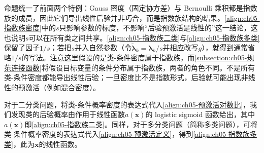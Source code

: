 \documentclass[../../main.tex]{subfiles}
\begin{document}
\begin{remark}
命题统一了前面两个特例：Gauss 密度（固定协方差）与 Bernoulli 乘积都是指数族的成员，因此它们导出线性后验并非巧合，而是指数族结构的结果。\eqref{align:ch05-指数族密度}中的$s$只影响参数的标度，不影响“后验预激活是线性的”这一结论，这也说明$s$可以在所有类之间共享。\eqref{align:ch05-指数族二类}与\eqref{align:ch05-指数族多类}保留了因子$1/s$；若把$s$并入自然参数（令$\tilde{\boldsymbol{\lambda}}_k=\boldsymbol{\lambda}_k/s$并相应改写$g$），就得到通常省略$1/s$的写法。注意这里假设的是类-条件密度属于指数族，而\cref{subsection:ch05-规范连接函数}将假设目标变量的条件分布属于指数族，两者的角色不同。不是所有类-条件密度都能导出线性后验；一旦密度比不是指数形式，后验就可能出现非线性的预激活（例如混合密度）。
\end{remark}

对于二分类问题，将类-条件概率密度的表达式代入\eqref{align:ch05-预激活对数比}，我们发现类的后验概率由作用于线性函数$a(\boldsymbol{x})$的 logistic sigmoid 函数给出，其中$a(\boldsymbol{x})$即\eqref{align:ch05-指数族二类}。同样，对于多分类问题（简称多类问题），可将类-条件概率密度的表达式代入\eqref{align:ch05-预激活定义}，得到\eqref{align:ch05-指数族多类}，此为$\boldsymbol{x}$的线性函数。
\end{document}
